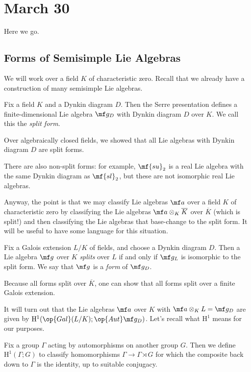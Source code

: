 \documentclass[../notes.tex]{subfiles}
\begin{document}
\section{March 30}
Here we go.

\subsection{Forms of Semisimple Lie Algebras}
We will work over a field $K$ of characteristic zero. Recall that we already have a construction of many semisimple Lie algebras.
\begin{definition}
	Fix a field $K$ and a Dynkin diagram $D$. Then the Serre presentation defines a finite-dimensional Lie algebra $\mf g_D$ with Dynkin diagram $D$ over $K$. We call this the \textit{split form}.
\end{definition}
\begin{example}
	Over algebraically closed fields, we showed that all Lie algebras with Dynkin diagram $D$ are split forms.
\end{example}
\begin{example}
	There are also non-split forms: for example, $\mf{su}_2$ is a real Lie algebra with the same Dynkin diagram as $\mf{sl}_2$, but these are not isomorphic real Lie algebras.
\end{example}
Anyway, the point is that we may classify Lie algebras $\mf a$ over a field $K$ of characteristic zero by classifying the Lie algebras $\mf a\otimes_K\overline K$ over $\overline K$ (which is split!) and then classifying the Lie algebras that base-change to the split form. It will be useful to have some language for this situation.
\begin{definition}[form]
	Fix a Galois extension $L/K$ of fields, and choose a Dynkin diagram $D$. Then a Lie algebra $\mf g$ over $K$ \textit{splits} over $L$ if and only if $\mf g_L$ is isomorphic to the split form. We say that $\mf g$ is a \textit{form} of $\mf g_D$.
\end{definition}
\begin{remark}
	Because all forms split over $\overline K$, one can show that all forms split over a finite Galois extension.
\end{remark}
It will turn out that the Lie algebras $\mf a$ over $K$ with $\mf a\otimes_KL=\mf g_D$ are given by $\mathrm H^1(\op{Gal}(L/K);\op{Aut}\mf g_D)$. Let's recall what $\mathrm H^1$ means for our purposes.
\begin{definition}
	Fix a group $\Gamma$ acting by automorphisms on another group $G$. Then we define $\mathrm H^1(\Gamma;G)$ to classify homomorphisms $\Gamma\to\Gamma\rtimes G$ for which the composite back down to $\Gamma$ is the identity, up to suitable conjugacy.
\end{definition}
\end{document}
